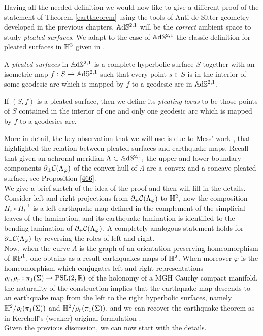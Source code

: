 Having all the needed definition we would now like to give a different proof of the statement of Theorem \ref{earttheorem} using the tools of Anti-de Sitter geometry developed in the previous chapters. $\A^{2,1}$ will be the \textit{correct} ambient space to study \textit{pleated surfaces}. We adapt to the case of $\A^{2,1}$ the classic definition for pleated surfaces in $\H^3$ given in \cite{canary2006fundamentals}. 

\begin{definition}
    A \textit{pleated surfaces} in $\A^{2,1}$ is a complete hyperbolic surface $S$ together with an isometric map $f:S\to\A^{2,1}$ such that every point $s\in S$ is in the interior of some geodesic arc which is mapped by $f$ to a geodesic arc in $\A^{2,1}$. 
\end{definition}

\begin{definition}
    If $(S,f)$ is a pleated surface, then we define its \textit{pleating locus} to be those points of $S$ contained in the interior of one and only one geodesic arc which is mapped by $f$ to a geodesics arc.   
\end{definition}

More in detail, the key observation that we will use is due to Mess' work \cite{Mess}, that highlighted the relation between pleated surfaces and earthquake maps. Recall that given an achronal meridian $\Lambda\subset\A^{2,1},$ the upper and lower boundary components $\partial_{\pm}\CF$ of the convex hull of $\Lambda$ are a convex and a concave pleated surface, see Proposition \ref{466}.\\
We give a brief sketch of the idea of the proof and then will fill in the details. Consider left and right projections from $\partial_+\CF$ to $\H^2,$ now the composition $\Pi_r\circ\Pi_l^{-1}$  is a left earthquake map defined in the complement of the simplicial leaves of the lamination, and its earthquake lamination is identified to the bending lamination of $\partial_{+}\CF$. A completely analogous statement holds for $\partial_{-}\CF$ by reversing the roles of left and right.\\  
Now, when the curve $\Lambda$ is the graph of an orientation-preserving homeomorphism of $\S$, one obtains as a result earthquakes maps of $\H^2$. When moreover $\varphi$ is the homeomorphism which conjugates left and right representations $\rho_l,\rho_r:\pi_1(\Sigma)\to\PSL$ of the holonomy of a MGH Cauchy compact manifold, the naturality of the construction implies that the earthquake map descends to an earthquake map from the left to the right hyperbolic surfaces, namely $\H^2/\rho_l(\pi_1(\Sigma))$ and $\H^2/\rho_r(\pi_1(\Sigma))$, and we can recover the earthquake theorem as in Kerchoff's (weaker) original formulation \cite{kerckhoff1983nielsen}.\\
Given the previous discussion, we can now start with the details.


